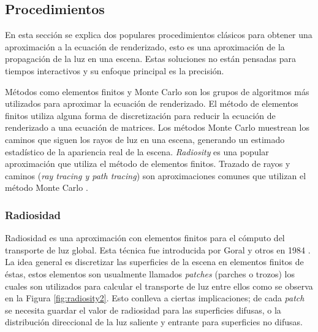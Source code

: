 \subsection{Procedimientos}
\label{sub:render_eq_procedures}
En esta sección se explica dos populares procedimientos clásicos para obtener una aproximación a la ecuación de renderizado, esto es una aproximación de la propagación de la luz en una escena. Estas soluciones no están pensadas para tiempos interactivos y su enfoque principal es la precisión.

Métodos como elementos finitos y Monte Carlo son los grupos de algoritmos más utilizados para aproximar la ecuación de renderizado. El método de elementos finitos utiliza alguna forma de discretización para reducir la ecuación de renderizado a una ecuación de matrices. Los métodos Monte Carlo muestrean los caminos que siguen los rayos de luz en una escena, generando un estimado estadístico de la apariencia real de la escena. \emph{Radiosity} es una popular aproximación que utiliza el método de elementos finitos. Trazado de rayos y caminos (\emph{ray tracing y path tracing}) son aproximaciones comunes que utilizan el método Monte Carlo \cite{gi_renderingeq}. 

\subsubsection{Radiosidad}
\label{subsec:radiosity}

Radiosidad es una aproximación con elementos finitos para el cómputo del transporte de luz global. Esta técnica fue introducida por Goral y otros en 1984 \cite{goral84}. La idea general es discretizar las superficies de la escena en elementos finitos de éstas, estos elementos son usualmente llamados \emph{patches} (parches o trozos) los cuales son utilizados para calcular el transporte de luz entre ellos como se observa en la Figura \ref{fig:radiosity2}. Esto conlleva a ciertas implicaciones; de cada \emph{patch} se necesita guardar el valor de radiosidad para las superficies difusas, o la distribución direccional de la luz saliente y entrante para superficies no difusas.

